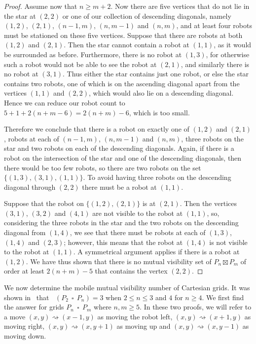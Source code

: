 \documentclass[a4paper,12pt]{article}
\DeclareMathOperator{\mobmv}{Mob_{\mu}}
\DeclareMathOperator{\cp}{\,\square\,}
\theoremstyle{definition}
\newcommand{\move}{\rightsquigarrow}
\begin{document}
\begin{proof}
		Assume now that $n \geq m+2$. Now there are five vertices that do not lie in the star at $(2,2)$ or one of our collection of descending diagonals, namely $(1,2)$, $(2,1)$, $(n-1,m)$, $(n,m-1)$ and $(n,m)$, and at least four robots must be stationed on these five vertices. Suppose that there are robots at both $(1,2)$ and $(2,1)$. Then the star cannot contain a robot at $(1,1)$, as it would be surrounded as before. Furthermore, there is no robot at $(1,3)$, for otherwise such a robot would not be able to see the robot at $(2,1)$, and similarly there is no robot at $(3,1)$. Thus either the star contains just one robot, or else the star contains two robots, one of which is on the ascending diagonal apart from the vertices $(1,1)$ and $(2,2)$, which would also lie on a descending diagonal. Hence we can reduce our robot count to $5+1+2(n+m-6) = 2(n+m)-6$, which is too small.
		
		Therefore we conclude that there is a robot on exactly one of $(1,2)$ and $(2,1)$, robots at each of $(n-1,m)$, $(n,m-1)$ and $(n,m)$, three robots on the star and two robots on each of the descending diagonals. Again, if there is a robot on the intersection of the star and one of the descending diagonals, then there would be too few robots, so there are two robots on the set $\{ (1,3),(3,1),(1,1)\} $. To avoid having three robots on the descending diagonal through $(2,2)$ there must be a robot at $(1,1)$. 
		
		Suppose that the robot on $\{ (1,2),(2,1)\} $ is at $(2,1)$. Then the vertices $(3,1)$, $(3,2)$ and $(4,1)$ are not visible to the robot at $(1,1)$, so, considering the three robots in the star and the two robots on the descending diagonal from $(1,4)$, we see that there must be robots at each of $(1,3)$, $(1,4)$ and $(2,3)$; however, this means that the robot at $(1,4)$ is not visible to the robot at $(1,1)$. A symmetrical argument applies if there is a robot at $(1,2)$. We have thus shown that there is no mutual visibility set of $P_n \boxtimes P_m$ of order at least $2(n+m)-5$ that contains the vertex $(2,2)$.
		
	\end{proof}
	
	We now determine the mobile mutual visibility number of Cartesian grids. It was shown in~\cite[Proposition 6.2]{dettlaff2024} that $\mobmv (P_2 \cp P_n) = 3$ when $2 \leq n \leq 3$ and $4$ for $n \geq 4$. We first find the answer for grids $P_n \cp P_m$ where $n,m \geq 5$. In these two proofs, we will refer to a move $(x,y) \move (x-1,y)$ as moving the robot left, $(x,y) \move (x+1,y)$ as moving right, $(x,y) \move (x,y+1)$ as moving up and $(x,y) \move (x,y-1)$ as moving down.
	
\end{document}
